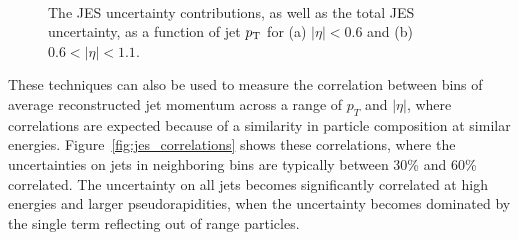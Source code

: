 \begin{figure}[ht]
\centering
{} \\
\caption{ The \ac{JES} uncertainty contributions, as well as the total \ac{JES} uncertainty, as a function of jet $p_{\mathrm{T}}$ for (a) $|\eta| < 0.6$ and (b) $0.6 < |\eta| < 1.1$.}
\label{fig:jes_uncertainty}
\end{figure}

These techniques can also be used to measure the correlation between bins of average reconstructed jet momentum across a range of $p_T$ and $|\eta|$, where correlations are expected because of a similarity in particle composition at similar energies.
Figure~\ref{fig:jes_correlations} shows these correlations, where the uncertainties on jets in neighboring bins are typically between 30\% and 60\% correlated. 
The uncertainty on all jets becomes significantly correlated at high energies and larger pseudorapidities, when the uncertainty becomes dominated by the single term reflecting out of range particles.

